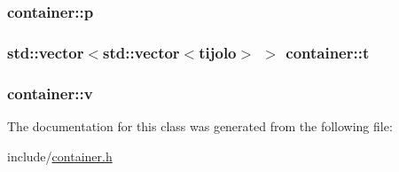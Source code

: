 \subsubsection[{\texorpdfstring{p}{p}}]{ container\+::p}\hypertarget{classcontainer_acd76736c06d59233703b8df3bed61d69}{}\label{classcontainer_acd76736c06d59233703b8df3bed61d69}
\subsubsection[{\texorpdfstring{t}{t}}]{\setlength{\rightskip}{0pt plus 5cm}std\+::vector$<$std\+::vector$<${\bf tijolo}$>$ $>$ container\+::t}\hypertarget{classcontainer_a84e973e8af87828958dff85ad4053b03}{}\label{classcontainer_a84e973e8af87828958dff85ad4053b03}
\subsubsection[{\texorpdfstring{v}{v}}]{ container\+::v}\hypertarget{classcontainer_a4325e82e5cadf6795d352eff867701ea}{}\label{classcontainer_a4325e82e5cadf6795d352eff867701ea}


The documentation for this class was generated from the following file\+:\begin{DoxyCompactItemize}
\item 
include/\hyperlink{container_8h}{container.\+h}\end{DoxyCompactItemize}
